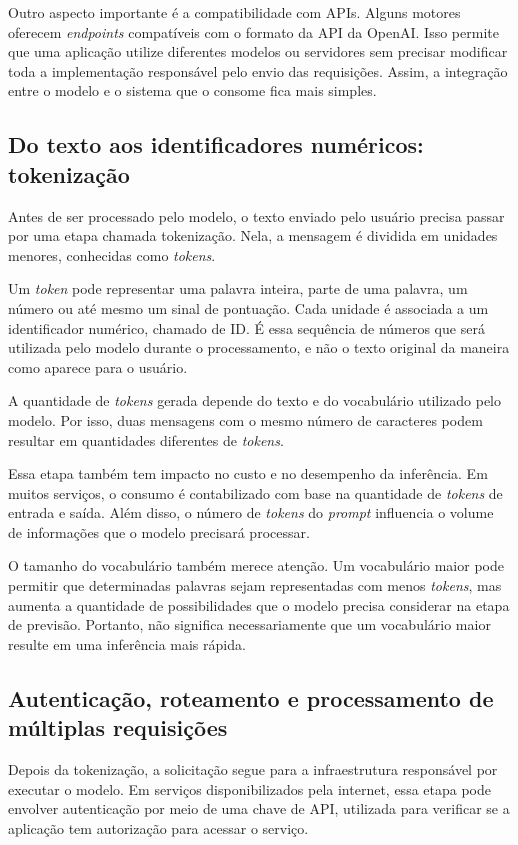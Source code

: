 \documentclass[12pt, a4paper]{article}
\begin{document}
Outro aspecto importante é a compatibilidade com APIs. Alguns motores oferecem \textit{endpoints} compatíveis com o formato da API da OpenAI. Isso permite que uma aplicação utilize diferentes modelos ou servidores sem precisar modificar toda a implementação responsável pelo envio das requisições. Assim, a integração entre o modelo e o sistema que o consome fica mais simples.

\subsection{Do texto aos identificadores numéricos: tokenização}

Antes de ser processado pelo modelo, o texto enviado pelo usuário precisa passar por uma etapa chamada tokenização. Nela, a mensagem é dividida em unidades menores, conhecidas como \textit{tokens}.

Um \textit{token} pode representar uma palavra inteira, parte de uma palavra, um número ou até mesmo um sinal de pontuação. Cada unidade é associada a um identificador numérico, chamado de ID. É essa sequência de números que será utilizada pelo modelo durante o processamento, e não o texto original da maneira como aparece para o usuário.

A quantidade de \textit{tokens} gerada depende do texto e do vocabulário utilizado pelo modelo. Por isso, duas mensagens com o mesmo número de caracteres podem resultar em quantidades diferentes de \textit{tokens}.

Essa etapa também tem impacto no custo e no desempenho da inferência. Em muitos serviços, o consumo é contabilizado com base na quantidade de \textit{tokens} de entrada e saída. Além disso, o número de \textit{tokens} do \textit{prompt} influencia o volume de informações que o modelo precisará processar.

O tamanho do vocabulário também merece atenção. Um vocabulário maior pode permitir que determinadas palavras sejam representadas com menos \textit{tokens}, mas aumenta a quantidade de possibilidades que o modelo precisa considerar na etapa de previsão. Portanto, não significa necessariamente que um vocabulário maior resulte em uma inferência mais rápida.

\subsection{Autenticação, roteamento e processamento de múltiplas requisições}

Depois da tokenização, a solicitação segue para a infraestrutura responsável por executar o modelo. Em serviços disponibilizados pela internet, essa etapa pode envolver autenticação por meio de uma chave de API, utilizada para verificar se a aplicação tem autorização para acessar o serviço.
\end{document}
